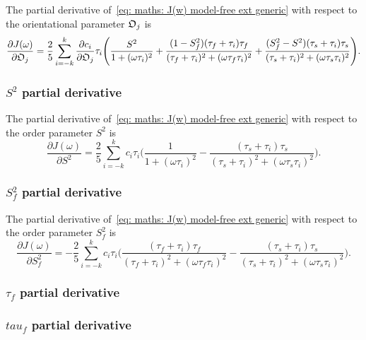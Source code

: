 The partial derivative of~\eqref{eq: maths: J(w) model-free ext generic} with respect to the orientational parameter $\mathfrak{O}_j$ is
\begin{equation}
    \frac{\partial J(\omega)}{\partial \mathfrak{O}_j} = \frac{2}{5} \sum_{i=-k}^k \frac{\partial c_i}{\partial \mathfrak{O}_j} \tau_i \Bigg(
        \frac{S^2}{1 + (\omega \tau_i)^2}
        + \frac{(1 - S^2_f)(\tau_f + \tau_i)\tau_f}{(\tau_f + \tau_i)^2 + (\omega \tau_f \tau_i)^2}
        + \frac{(S^2_f - S^2)(\tau_s + \tau_i)\tau_s}{(\tau_s + \tau_i)^2 + (\omega \tau_s \tau_i)^2}
    \Bigg).
\end{equation}



\subsubsection{$S^2$ partial derivative}

The partial derivative of~\eqref{eq: maths: J(w) model-free ext generic} with respect to the order parameter $S^2$ is
\begin{equation}
    \frac{\partial J(\omega)}{\partial S^2} = \frac{2}{5} \sum_{i=-k}^k c_i \tau_i \Bigg(
        \frac{1}{1 + (\omega \tau_i)^2}
        - \frac{(\tau_s + \tau_i)\tau_s}{(\tau_s + \tau_i)^2 + (\omega \tau_s \tau_i)^2}
    \Bigg).
\end{equation}



\subsubsection{$S^2_f$ partial derivative}

The partial derivative of~\eqref{eq: maths: J(w) model-free ext generic} with respect to the order parameter $S^2_f$ is
\begin{equation}
    \frac{\partial J(\omega)}{\partial S^2_f} = -\frac{2}{5} \sum_{i=-k}^k c_i \tau_i \Bigg(
        \frac{(\tau_f + \tau_i)\tau_f}{(\tau_f + \tau_i)^2 + (\omega \tau_f \tau_i)^2}
        - \frac{(\tau_s + \tau_i)\tau_s}{(\tau_s + \tau_i)^2 + (\omega \tau_s \tau_i)^2}
    \Bigg).
\end{equation}



\begin{latexonly}
    \subsubsection{$\tau_f$ partial derivative}
\end{latexonly}
\begin{htmlonly}
    \subsubsection{$tau_f$ partial derivative}
\end{htmlonly}

